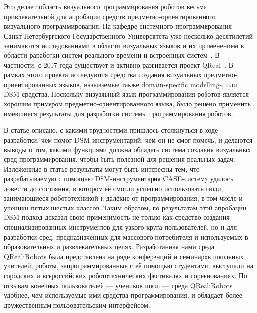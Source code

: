 \documentclass[a4paper]{article}
\begin{document}
Это делает область визуального программирования роботов весьма привлекательной для апробации средств предметно-ориентированного визуального программирования. На кафедре системного программирования Санкт-Петербургского Государственного Университета уже несколько десятилетий занимаются исследованиями в области визуальных языков и их применением в области раработки систем реального времени и встроенных систем~\cite{videoDsl}\cite{dsmPlatforms}\cite{real1}\cite{real2}\cite{student1}\cite{student2}. В частности, с 2007 года существует и активно развивается проект QReal~\cite{qReal}. В рамках этого проекта исследуются средства создания визуальных предметно-ориентированных языков, называемые также domain-specific modelling-, или DSM-средства. Поскольку визуальный язык программирования роботов является хорошим примером предметно-ориентированного языка, было решено применить имевшиеся результаты для разработки системы программирования роботов. 

В статье описано, с какими трудностями пришлось столкнуться в ходе разработки, чем помог DSM-инструментарий, чем он не смог помочь, и делаются выводы о том, какими функциями должна обладать система создания визуальных сред программирования, чтобы быть полезной для решения реальных задач. Изложенные в статье результаты могут быть интересны тем, что разрабатываемую с помощью DSM-инструментария CASE-систему удалось довести до состояния, в котором её смогли успешно использовать люди, занимающиеся робототехникой и далёкие от программирования, в том числе и ученики пятых-шестых классов. Таким образом, по результатам этой апробации DSM-подход доказал свою применимость не только как средство создания специализированных инструментов для узкого круга пользователей, но и для разработки сред, предназначенных для массового потребителя и используемых в образовательных и развлекательных целях. Разработанная нами среда QReal:Robots была представлена на ряде конференций и семинаров школьных учителей, роботы, запрограммированные с её помощью студентами, выступали на городских и всероссийских робототехнических фестивалях и соревнованиях. По отзывам конечных пользователей --- учеников школ --- среда QReal:Robots удобнее, чем используемые ими средства программирования, и обладает более дружественным пользовательским интерфейсом.
\end{document}
